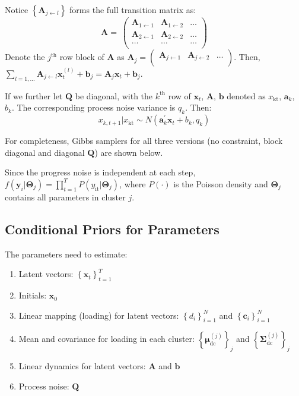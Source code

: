\documentclass[]{article}
\begin{document}
Notice \(\left\{ \mathbf{A}_{j \leftarrow l} \right\}\) forms the full transition matrix as:
\[\mathbf{A} = \ \begin{pmatrix}
	\mathbf{A}_{1 \leftarrow 1} & \mathbf{A}_{1 \leftarrow 2} & \ldots \\
	\mathbf{A}_{2 \leftarrow 1} & \mathbf{A}_{2 \leftarrow 2} & \ldots \\
	\ldots\  & \ldots & \ldots \\
\end{pmatrix}\]
Denote the \(j^{\text{th}}\) row block of \(\mathbf{A}\) as
\(\mathbf{A}_{j} = \begin{pmatrix}
	\mathbf{A}_{j \leftarrow 1} & \mathbf{A}_{j \leftarrow 2} & \ldots \\
\end{pmatrix}\). Then,
\(\sum_{l = 1,\ldots}^{}\mathbf{A}_{j \leftarrow l}\mathbf{x}_{t}^{(l)} + \mathbf{b}_{j}\mathbf{=}\mathbf{A}_{j}\mathbf{x}_{t} + \mathbf{b}_{j}\).

If we further let \(\mathbf{Q}\) be diagonal, with the
\(k^{\text{th}}\) row of \(\mathbf{x}_{t}\), \(\mathbf{A}\),
\(\mathbf{b}\) denoted as \(x_{\text{kt}}\), \(\mathbf{a}_{k}\), \(b_{k}\). The corresponding process noise variance is \(q_{k}\). Then:
\[x_{k,t + 1}|x_{\text{kt}} \sim N\left( \mathbf{a}_{k}^{'}\mathbf{x}_{t} + b_{k},q_{k} \right)\]

For completeness, Gibbs samplers for all three versions (no constraint, block diagonal and diagonal \(\mathbf{Q}\)) are shown below. 

Since the progress noise is independent at each step,
\(f\left( \mathbf{y}_{i}|\mathbf{\Theta}_{j} \right) = \prod_{t = 1}^{T}{P(y_{\text{it}}|\mathbf{\Theta}_{j})}\),
where \(P( \cdot )\) is the Poisson density and \(\mathbf{\Theta}_{j}\) contains all parameters in cluster \(j\).

\subsection{Conditional Priors for Parameters}
The parameters need to estimate:
\begin{enumerate}
	\def\labelenumi{(\arabic{enumi})}
	\item
	Latent vectors: \(\left\{ \mathbf{x}_{t} \right\}_{t=1}^T\)
	\item
	Initials: \(\mathbf{x}_{0}\)
	\item
	Linear mapping (loading) for latent vectors:
	\(\left\{ d_{i} \right\}_{i = 1}^{N}\) and
	\(\left\{ \mathbf{c}_{i} \right\}_{i = 1}^{N}\)
	\item
	Mean and covariance for loading in each cluster:
	\(\left\{ \bm{\mu}_{\text{dc}}^{(j)} \right\}_{j}\) and
	\(\left\{ \mathbf{\Sigma}_{\text{dc}}^{(j)} \right\}_{j}\)
	\item
	Linear dynamics for latent vectors: \(\mathbf{A}\) and \(\mathbf{b}\)
	\item
	Process noise: \(\mathbf{Q}\)
\end{enumerate}
\end{document}
